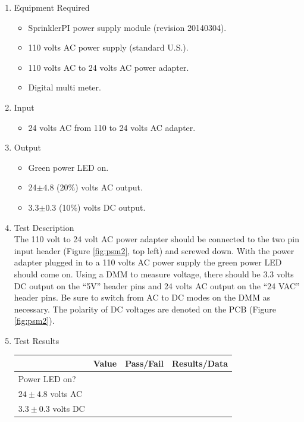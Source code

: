 \documentclass{article}
\begin{document}
\begin{enumerate}
\item Equipment Required
	\begin{itemize}
	\item SprinklerPI power supply module (revision 20140304).
	\item 110 volts AC power supply (standard U.S.).
	\item 110 volts AC to 24 volts AC power adapter.
	\item Digital multi meter.
	\end{itemize}
\item Input
	\begin{itemize}
	\item 24 volts AC from 110 to 24 volts AC adapter.
	\end{itemize}
\item Output
	\begin{itemize}
	\item Green power LED on.
	\item 24$\pm4.8$ (20\%) volts AC output.
	\item 3.3$\pm0.3$ (10\%) volts DC output.
	\end{itemize}
\pagebreak
\item Test Description \\

The 110 volt to 24 volt AC power adapter should be connected to the
two pin input header (Figure \ref{fig:psm2}, top left) and screwed down.
With the power adapter plugged in to a 110 volts AC power supply the
green power LED should come on.
Using a DMM to measure voltage, there should be 3.3 volts DC output on
the ``5V'' header pins and 24 volts AC output on the ``24 VAC'' header pins.
Be sure to switch from AC to DC modes on the DMM as necessary.
The polarity of DC voltages are denoted on the PCB (Figure \ref{fig:psm2}).

\item Test Results \\
	\vspace{0.2in}
	\begin{tabular}{|l|l|l|l|}
		\hline
		& Value & Pass/Fail & Results/Data\hspace{2in} \\
		\hline
		Power LED on? &&& \\
		\hline
		$24\pm4.8$ volts AC &&& \\
		\hline
		$3.3\pm0.3$ volts DC &&& \\
		\hline
	\end{tabular}
\end{enumerate}
\end{document}
